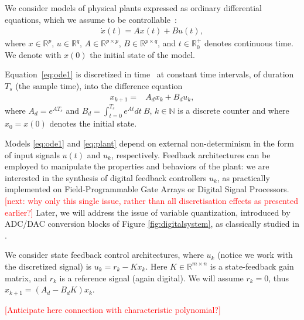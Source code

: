 \documentclass[twocolumn]{autart}    %
\newcommand{\mat}[1]{{#1}}
\renewcommand{\vec}[1]{{#1}}
\renewcommand{\note}[1]{\textcolor{red}{[#1]}}
\begin{document}
We consider models of physical plants expressed as ordinary differential
equations, which we assume to be controllable~\cite{Astrom08}: 
%
\begin{align}
\label{eq:ode1}
\dot{x}(t) = \mat{A}\vec{x}(t)+ \mat{B} \vec{u}(t), 
\end{align}
%
where 
$\vec{x} \in \mathbb{R}^p$,  
$\vec{u} \in \mathbb{R}^q$, 
$\mat{A} \in \mathbb{R}^{p \times p}$, 
$\mat{B} \in \mathbb{R}^{p \times q}$,
and $t \in \mathbb R_0^+$ denotes continuous time. 
We denote with $x(0)$ the initial state of the model.

Equation~\eqref{eq:ode1} is 
discretized in time~\cite{middleton1990digital,van1978computing} at constant time intervals,
of duration $T_s$ (the sample time), 
into the difference equation
%
\begin{align}
\label{eq:plant}
\vec{x}_{k+1} =& \mat{A}_d \vec{x}_k+ \mat{B}_d \vec{u}_k, 
\end{align} 
where 
$\mat{A}_d=e^{\mat{A}T_s}$ and 
$\mat{B}_d = \int_{t = 0}^{T_s} e^{\mat{A} t} dt\ \mat{B}$, 
$k \in \mathbb N$ is a discrete counter and where $\vec{x}_{0}=\vec{x}(0)$ denotes the initial state.  

Models \eqref{eq:ode1} and \eqref{eq:plant} depend on external non-determinism in the form of input signals $u (t)$ and  $u_k$, respectively. 
Feedback architectures can be employed to manipulate the properties and behaviors of the plant:    
we are interested in the synthesis of digital feedback controllers $u_k$,  
as practically implemented on Field-Programmable Gate Arrays or Digital Signal Processors. 
\note{next: why only this single issue, rather than all discretisation effects as presented earlier?} Later, we will address the issue of variable quantization, 
introduced by ADC/DAC conversion blocks of Figure \ref{fig:digitalsystem}, 
as classically studied in \cite{astrom1997computer}. 

We consider state feedback control architectures, 
where $u_k$ (notice we work with the discretized signal) is $u_k = r_{k} - K x_k$. 
Here $K \in \mathbb{R}^{m \times n}$ is a state-feedback gain matrix, 
and $r_{k}$ is a reference signal (again digital). 
We will assume $r_k=0$, thus 
$\vec{x}_{k+1}=(\mat{A}_d-\mat{B}_d\mat{K})\vec{x}_k$. 

\note{Anticipate here connection with characteristic polynomial?}

\end{document}
